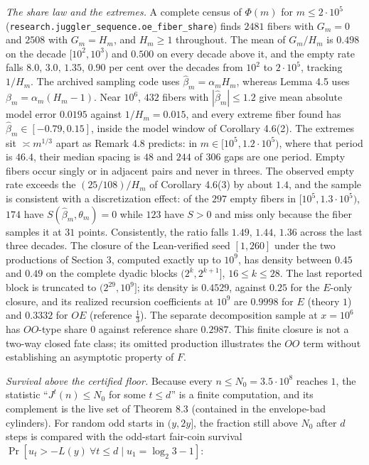 \documentclass[11pt,a4paper]{article}
\begin{document}
\emph{The share law and the extremes.} A complete census of \(\Phi(m)\)
for \(m\le2\cdot10^5\)
(\texttt{\nolinkurl{research.juggler_sequence.oe_fiber_share}}) finds
\(2481\) fibers with \(G_m=0\) and \(2508\) with \(G_m=H_m\), and
\(H_m\ge1\) throughout. The mean of \(G_m/H_m\) is \(0.498\) on the
decade \([10^2,10^3)\) and \(0.500\) on every decade above it, and the
empty rate falls \(8.0,\,3.0,\,1.35,\,0.90\) per cent over the decades
from \(10^2\) to \(2\cdot10^5\), tracking \(1/H_m\). The archived
sampling code uses \(\widehat\beta_m=\alpha_mH_m\), whereas Lemma 4.5
uses \(\beta_m=\alpha_m(H_m-1)\). Near \(10^6\), \(432\) fibers with
\(|\widehat\beta_m|\le1.2\) give mean absolute model error \(0.0195\)
against \(1/H_m=0.015\), and every extreme fiber found has
\(\widehat\beta_m\in[-0.79,0.15]\), inside the model window of Corollary
4.6(2). The extremes sit \(\asymp m^{1/3}\) apart as Remark 4.8
predicts: in \(m\in[10^5,1.2\cdot10^5)\), where that period is \(46.4\),
their median spacing is \(48\) and \(244\) of \(306\) gaps are one
period. Empty fibers occur singly or in adjacent pairs and never in
threes. The observed empty rate exceeds the \((25/108)/H_m\) of
Corollary 4.6(3) by about \(1.4\), and the sample is consistent with a
discretization effect: of the \(297\) empty fibers in
\([10^5,1.3\cdot10^5)\), \(174\) have \(S(\widehat\beta_m,\theta_m)=0\)
while \(123\) have \(S>0\) and miss only because the fiber samples it at
\(31\) points. Consistently, the ratio falls \(1.49,\,1.44,\,1.36\)
across the last three decades. The closure of the Lean-verified seed
\([1,260]\) under the two productions of Section 3, computed exactly up
to \(10^9\), has density between \(0.45\) and \(0.49\) on the complete
dyadic blocks \((2^k,2^{k+1}]\), \(16\le k\le28\). The last reported
block is truncated to \((2^{29},10^9]\); its density is \(0.4529\),
against \(0.25\) for the \(E\)-only closure, and its realized recursion
coefficients at \(10^9\) are \(0.9998\) for \(E\) (theory \(1\)) and
\(0.3332\) for \(OE\) (reference \(\tfrac13\)). The separate
decomposition sample at \(x=10^6\) has \(OO\)-type share \(0\) against
reference share \(0.2987\). This finite closure is not a two-way closed
fate class; its omitted production illustrates the \(OO\) term without
establishing an asymptotic property of \(F\).

\emph{Survival above the certified floor.} Because every
\(n\le N_0=3.5\cdot 10^8\) reaches \(1\), the statistic
``\(J^t(n)\le N_0\) for some \(t\le d\)'' is a finite computation, and
its complement is the live set of Theorem 8.3 (contained in the
envelope-bad cylinders). For random odd starts in \((y,2y]\), the
fraction still above \(N_0\) after \(d\) steps is compared with the
odd-start fair-coin survival
\(\Pr[u_t>-L(y)\ \forall t\le d\mid u_1=\log_2 3-1]\):
\end{document}
